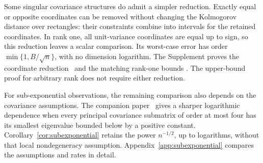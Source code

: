 \documentclass[11pt,letterpaper]{article}
\theoremstyle{remark}
\begin{document}
Some singular covariance structures do admit a simpler reduction.
Exactly equal or opposite coordinates can be removed without changing
the Kolmogorov distance over rectangles: their constraints combine
into intervals for the retained coordinates. In rank one, all unit-variance
coordinates are equal up to sign, so this reduction leaves a scalar
comparison. Its worst-case error has order
\(\min\{1,B/\sqrt n\}\), with no dimension logarithm.
The Supplement proves the coordinate reduction~\cite[Section~S.5,
Proposition~S.6]{Supplement} and the matching rank-one bounds
\cite[Section~S.4.3, Proposition~S.4]{Supplement}. The upper-bound
proof for arbitrary rank does not require either reduction.

For sub-exponential observations, the remaining comparison also
depends on the covariance assumptions. The companion
paper~\cite{Local} gives a sharper logarithmic dependence when every
principal covariance submatrix of order at most four has its smallest
eigenvalue bounded below by a positive constant.
Corollary~\ref{cor:subexponential} retains the power \(n^{-1/2}\), up
to logarithms, without that local nondegeneracy assumption.
Appendix~\ref{app:subexponential} compares the assumptions and rates
in detail.
\end{document}
